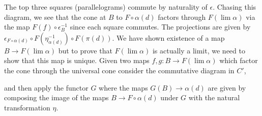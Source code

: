 \documentclass[12pt]{extarticle}
\begin{document}
\begin{center}
\end{center} 
The top three squares (parallelograms) commute by naturality of $\epsilon$.
Chasing this diagram, we see that the cone at $B$ to $F \circ \alpha(d)$ factors through $F(\lim{\alpha})$ via the map $F(f) \circ \epsilon_B^{-1}$ since each square commutes. The projections are given by $\epsilon_{F \circ \alpha(d)} \circ F(\eta_{\alpha(d)}^{-1}) \circ F(\pi(d))$. We have shown existence of a map $B \to F(\lim{\alpha})$ but to prove that $F(\lim{\alpha})$ is actually a limit, we need to show that this map is unique. Given two maps $f, g : B \to F(\lim{\alpha})$ which factor the cone through the universal cone consider the commutative diagram in $C'$,
\begin{center}
\end{center}  
and then apply the functor $G$ where the maps $G(B) \to \alpha(d)$ are given by composing the image of the maps $B \to F \circ \alpha(d)$ under $G$ with the natural transformation $\eta$.
\end{document}
